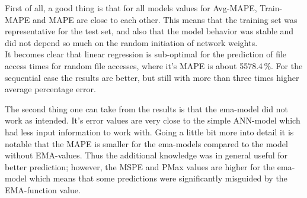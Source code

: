 \documentclass{superfri}
\begin{document}
First of all, a good thing is that for all models values for Avg-MAPE, Train-MAPE and MAPE are close to each other.
This means that the training set was representative for the test set, and also that the model behavior was stable and did not depend so much on the random initiation of network weights.
\\
It becomes clear that linear regression is sub-optimal for the prediction of file access times for random file accesses, where it's MAPE is about 5578.4\,\%. For the sequential case the results are better, but still with more than three times higher average percentage error.\medskip

The second thing one can take from the results is that the ema-model did not work as intended.
It's error values are very close to the simple ANN-model which had less input information to work with.
Going a little bit more into detail it is notable that the MAPE is smaller for the ema-models compared to the model without EMA-values.
Thus the additional knowledge was in general useful for better prediction; however, the MSPE and PMax values are higher for the ema-model which means that some predictions were significantly misguided by the EMA-function value.\medskip
\end{document}
